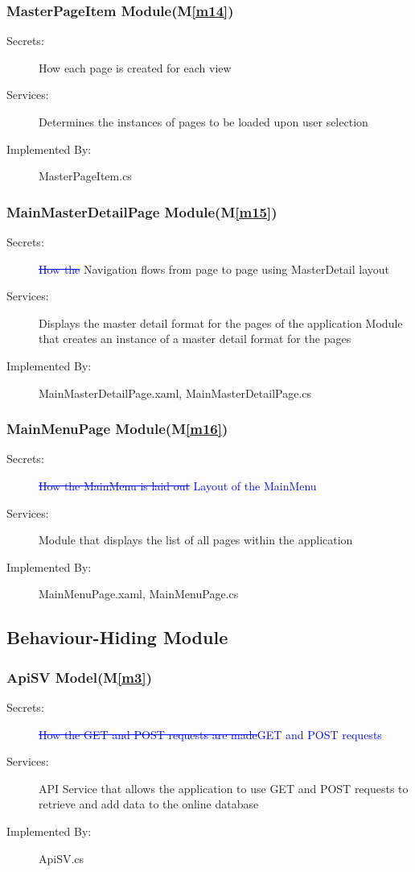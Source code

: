 \documentclass[12pt, titlepage]{article}
\newcommand{\mref}[1]{M\ref{#1}}
\begin{document}
\subsubsection{MasterPageItem Module(\mref{m14})}
\begin{description}
\item[Secrets:] How each page is created for each view
\item[Services:]Determines the instances of pages to be loaded upon user selection
\item[Implemented By:] MasterPageItem.cs
\end{description}

\subsubsection{MainMasterDetailPage Module(\mref{m15})}
\begin{description}
\item[Secrets:]\textcolor{blue}{\st{How the}} Navigation flows from page to page using MasterDetail layout
\item[Services:]Displays the master detail format for the pages of the application
Module that creates an instance of a master detail format for the pages
\item[Implemented By:]  MainMasterDetailPage.xaml, MainMasterDetailPage.cs
\end{description}

\subsubsection{MainMenuPage Module(\mref{m16})}
\begin{description}
\item[Secrets:] \textcolor{blue}{\st{How the MainMenu is laid out}} \textcolor{blue}{ Layout of the MainMenu}
\item[Services:]Module that displays the list of all pages within the application
\item[Implemented By:] MainMenuPage.xaml, MainMenuPage.cs
\end{description}

\subsection{Behaviour-Hiding Module}
\subsubsection{ApiSV Model(\mref{m3})}
\begin{description}
\item[Secrets:] \textcolor{blue}{\st{How the GET and POST requests are made}}\textcolor{blue}{GET and POST requests}
\item[Services:] API Service that allows the application to use GET and POST requests to retrieve and add data to the online database
\item[Implemented By:] ApiSV.cs
\end{description}
\end{document}
